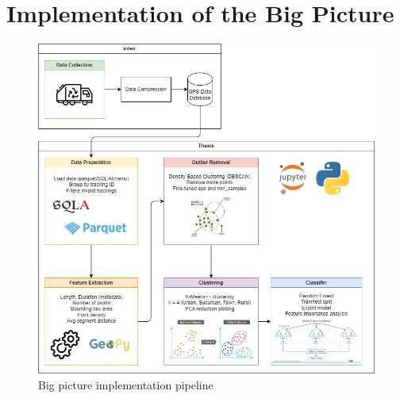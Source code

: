 \documentclass[a4paper,12pt,twoside]{scrreprt}
\begin{document}
\section{Implementation of the Big Picture}








\begin{figure}[htbp]
  \centering

  \includegraphics[width=\textwidth]{Diagrams/drawio/big_picture_implementation.png}
  \caption{Big picture implementation pipeline}
  \label{fig:big_picture_implemetation_diagram}
\end{figure}
\FloatBarrier
\end{document}
